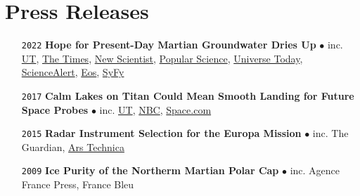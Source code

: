 \section*{Press Releases}

\begin{itemize}[leftmargin=3.8em, labelsep=1.5em]
    \setlength\itemsep{-.5em}
    \item[\texttt{2022}] \textbf{Hope for Present-Day Martian Groundwater Dries Up} $\bullet$ inc. \href{https://news.utexas.edu/2022/01/24/hope-for-present-day-martian-groundwater-dries-up/}{UT}, \href{https://www.thetimes.co.uk/article/hope-dries-up-of-water-on-mars-qngbmwdgp}{The Times}, \href{https://www.newscientist.com/article/2305601-mars-lake-may-actually-be-volcanic-rocks-buried-beneath-the-ice-cap/}{New Scientist}, \href{https://www.popsci.com/science/liquid-water-on-mars-debate/}{Popular Science}, \href{https://www.universetoday.com/154242/is-the-underground-lake-on-mars-just-volcanic-rock/#more-154242}{Universe Today}, \href{https://www.sciencealert.com/liquid-water-detected-under-mars-polar-ice-cap-was-probably-just-rock-new-study-reveals}{ScienceAlert}, \href{https://eos.org/articles/the-bumpy-search-for-liquid-water-at-the-south-pole-of-mars}{Eos}, \href{https://www.syfy.com/syfy-wire/bad-astronomy-liquid-water-under-martian-ice-cap-debate}{SyFy}
    \item[\texttt{2017}] \textbf{Calm Lakes on Titan Could Mean Smooth Landing for Future Space Probes} $\bullet$ inc. \href{https://news.utexas.edu/2017/07/06/calm-lakes-on-titan/}{UT}, \href{https://www.nbcnews.com/mach/science/you-can-forget-about-surfing-saturn-s-moon-titan-here-ncna780711}{NBC}, \href{https://www.space.com/37417-saturn-moon-titan-calm-seas-cassini.html}{Space.com}
    \item[\texttt{2015}] \textbf{Radar Instrument Selection for the Europa Mission} $\bullet$ inc. The Guardian, \href{https://arstechnica.com/science/2015/11/attempt-no-landing-there-yeah-right-were-going-to-europa/}{Ars Technica}
    \item[\texttt{2009}] \textbf{Ice Purity of the Northerm Martian Polar Cap} $\bullet$ inc. Agence France Press, France Bleu
\end{itemize}